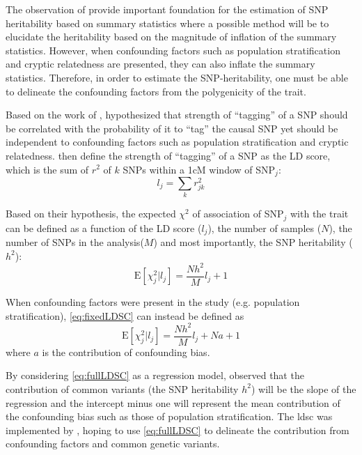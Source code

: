 	The observation of \citet{Yang2011b} provide important foundation for the estimation of \gls{SNP} heritability based on summary statistics where a possible method will be to elucidate the heritability based on the magnitude of inflation of the summary statistics. 
	However, when confounding factors such as population stratification and cryptic relatedness are presented, they can also inflate the summary statistics.
	Therefore, in order to estimate the \gls{SNP}-heritability, one must be able to delineate the confounding factors from the polygenicity of the trait.
	
	Based on the work of \citet{Yang2011b}, \citet{Bulik-Sullivan2015} hypothesized that strength of ``tagging'' of a \gls{SNP} should be correlated with the probability of it to ``tag'' the causal \gls{SNP} yet should be independent to confounding factors such as population stratification and cryptic relatedness.
	\citet{Bulik-Sullivan2015} then define the strength of ``tagging'' of a \gls{SNP} as the \gls{LD} score, which is the sum of $r^2$ of $k$ \glspl{SNP} within a 1cM window of \gls{SNP}$_j$:
	\begin{equation}
	l_j = \sum_kr^2_{jk}
	\label{eq:ldScore}
	\end{equation}
	
	Based on their hypothesis, the expected $\chi^2$ of association of \gls{SNP}$_j$ with the trait can be defined as a function of the \gls{LD} score ($l_j$), the number of samples ($N$), the number of \glspl{SNP} in the analysis($M$) and most importantly, the \gls{SNP} heritability ($h^2$):
	\begin{equation}
	\mathrm{E}[\chi^2_j | l_j] = \frac{Nh^2}{M}l_j+1
	\label{eq:fixedLDSC}
	\end{equation}
	
	When confounding factors were present in the study (e.g. population stratification), \cref{eq:fixedLDSC} can instead be defined as
	\begin{equation}
	\mathrm{E}[\chi^2_j | l_j] = \frac{Nh^2}{M}l_j+Na+1
	\label{eq:fullLDSC}
	\end{equation}
	where $a$ is the contribution of confounding bias.
	
	By considering \cref{eq:fullLDSC} as a regression model, \citet{Bulik-Sullivan2015} observed that the contribution of common variants (the \gls{SNP} heritability $h^2$) will be the slope of the regression and the intercept minus one will represent the mean contribution of the confounding bias such as those of population stratification. 
	The \gls{ldsc} was implemented by \citet{Bulik-Sullivan2015}, hoping to use \cref{eq:fullLDSC} to delineate the contribution from confounding factors and common genetic variants.
	
